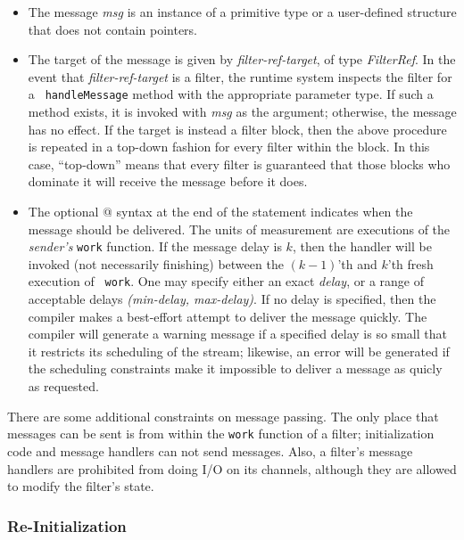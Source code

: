 \documentclass[draft]{article}
\begin{document}
\begin{itemize}

\item The message {\it msg} is an instance of a primitive type or a
user-defined structure that does not contain pointers.

\item The target of the message is given by {\it filter-ref-target},
of type {\it FilterRef}.  In the event that {\it filter-ref-target} is
a filter, the runtime system inspects the filter for a {\tt
handleMessage} method with the appropriate parameter type.  If such a
method exists, it is invoked with {\it msg} as the argument;
otherwise, the message has no effect.  If the target is instead a
filter block, then the above procedure is repeated in a top-down
fashion for every filter within the block.  In this case, ``top-down''
means that every filter is guaranteed that those blocks who dominate
it will receive the message before it does.

\item The optional @ syntax at the end of the statement indicates when
the message should be delivered.  The units of measurement are
executions of the {\it sender's} {\tt work} function.  If the message
delay is $k$, then the handler will be invoked (not necessarily
finishing) between the $(k-1)$'th and $k$'th fresh execution of {\tt
work}.  One may specify either an exact {\it delay}, or a range of
acceptable delays {\it (min-delay, max-delay)}.  If no delay is
specified, then the compiler makes a best-effort attempt to deliver
the message quickly.  The compiler will generate a warning message if
a specified delay is so small that it restricts its scheduling of the
stream; likewise, an error will be generated if the scheduling
constraints make it impossible to deliver a message as quicly as
requested.

\end{itemize}

There are some additional constraints on message passing.  The only
place that messages can be sent is from within the {\tt work} function
of a filter; initialization code and message handlers can not send
messages.  Also, a filter's message handlers are prohibited from doing
I/O on its channels, although they are allowed to modify the filter's
state.

\subsubsection{Re-Initialization}
\end{document}
